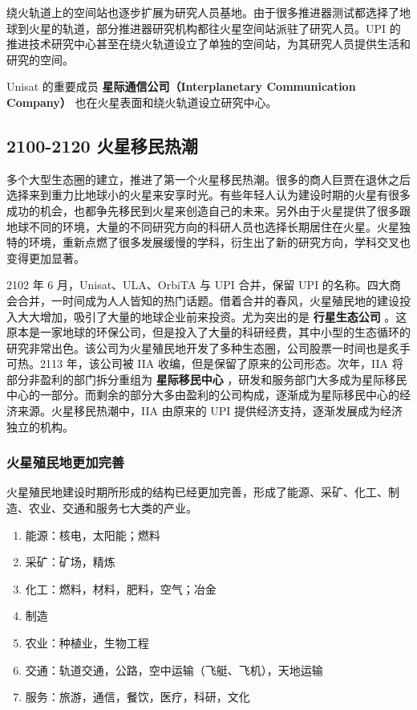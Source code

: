 \documentclass[letterpaper,10pt]{sphinxmanual}
\begin{document}
绕火轨道上的空间站也逐步扩展为研究人员基地。由于很多推进器测试都选择了地球到火星的轨道，部分推进器研究机构都往火星空间站派驻了研究人员。UPI 的推进技术研究中心甚至在绕火轨道设立了单独的空间站，为其研究人员提供生活和研究的空间。

Unisat 的重要成员 \textbf{星际通信公司（Interplanetary Communication Company）} 也在火星表面和绕火轨道设立研究中心。
\begin{figure}[htbp]
\centering
\end{figure}


\subsection{2100-2120 火星移民热潮}
\label{history:id27}
多个大型生态圈的建立，推进了第一个火星移民热潮。很多的商人巨贾在退休之后选择来到重力比地球小的火星来安享时光。有些年轻人认为建设时期的火星有很多成功的机会，也都争先移民到火星来创造自己的未来。另外由于火星提供了很多跟地球不同的环境，大量的不同研究方向的科研人员也选择长期居住在火星。火星独特的环境，重新点燃了很多发展缓慢的学科，衍生出了新的研究方向，学科交叉也变得更加显著。

2102 年 6 月，Unisat、ULA、OrbiTA 与 UPI 合并，保留 UPI 的名称。四大商会合并，一时间成为人人皆知的热门话题。借着合并的春风，火星殖民地的建设投入大大增加，吸引了大量的地球企业前来投资。尤为突出的是 \textbf{行星生态公司} 。这原本是一家地球的环保公司，但是投入了大量的科研经费，其中小型的生态循环的研究非常出色。该公司为火星殖民地开发了多种生态圈，公司股票一时间也是炙手可热。2113 年，该公司被 IIA 收编，但是保留了原来的公司形态。次年，IIA 将部分非盈利的部门拆分重组为 \textbf{星际移民中心} ，研发和服务部门大多成为星际移民中心的一部分。而剩余的部分大多由盈利的公司构成，逐渐成为星际移民中心的经济来源。火星移民热潮中，IIA 由原来的 UPI 提供经济支持，逐渐发展成为经济独立的机构。


\subsubsection{火星殖民地更加完善}
\label{history:id28}
火星殖民地建设时期所形成的结构已经更加完善，形成了能源、采矿、化工、制造、农业、交通和服务七大类的产业。
\begin{enumerate}
\item {} 
能源：核电，太阳能；燃料

\item {} 
采矿：矿场，精炼

\item {} 
化工：燃料，材料，肥料，空气；冶金

\item {} 
制造

\item {} 
农业：种植业，生物工程

\item {} 
交通：轨道交通，公路，空中运输（飞艇、飞机），天地运输

\item {} 
服务：旅游，通信，餐饮，医疗，科研，文化

\end{enumerate}
\end{document}
